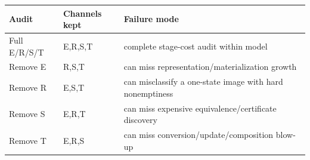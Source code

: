\begin{tabularx}{\textwidth}{llX}
\toprule
Audit & Channels kept & Failure mode \\
\midrule
Full E/R/S/T & E,R,S,T & complete stage-cost audit within model \\
Remove E & R,S,T & can miss representation/materialization growth \\
Remove R & E,S,T & can misclassify a one-state image with hard nonemptiness \\
Remove S & E,R,T & can miss expensive equivalence/certificate discovery \\
Remove T & E,R,S & can miss conversion/update/composition blow-up \\
\bottomrule
\end{tabularx}
